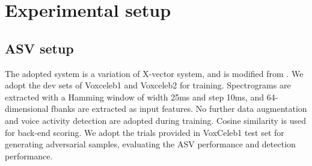 \section{Experimental setup}

\begin{table}[t]
\centering
\caption{EER with different $\epsilon$}
\label{tab:EER}
\end{table}

\subsection{ASV setup}
The adopted system is a variation of X-vector system, and is modified from \cite{chung2020defence}.
We adopt the dev sets of Voxceleb1 \cite{nagrani2017voxceleb} and Voxceleb2 \cite{chung2018voxceleb2} for training.
Spectrograms are extracted with a Hamming window of width 25ms and step 10ms, and 64-dimensional fbanks are extracted as input features.
No further data augmentation and voice activity detection are adopted during training.
Cosine similarity is used for back-end scoring.
We adopt the trials provided in VoxCeleb1 test set for generating adversarial samples, evaluating the ASV performance and detection performance.

